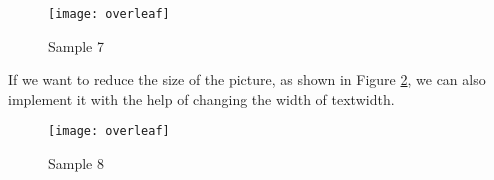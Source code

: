 \documentclass{article}
\begin{document}
\begin{figure}[h]
    \centering
    \texttt{[image: overleaf]}
    \caption{Sample 7}
    \label{model7}
\end{figure}
If we want to reduce the size of the picture, as shown in Figure \ref{model8}, we can also implement it with the help of changing the width of textwidth.

\begin{figure}[h]
    \centering
    \texttt{[image: overleaf]}
    \caption{Sample 8}
    \label{model8}
\end{figure}
\end{document}
